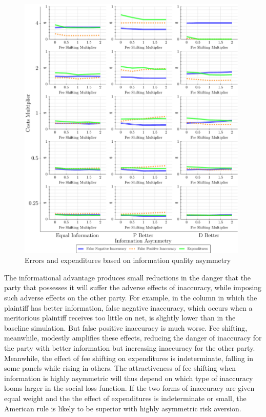 \documentclass{article}
\begin{document}
\begin{figure}
\begin{minipage}{0.48\textwidth}
        \includegraphics[width=0.98\textwidth, scale=0.70, trim={0in 0in 0in 0in}, clip]{../Figures/Accuracy and Expenditures Varying Information Asymmetry} %
        \caption{Errors and expenditures based on information quality asymmetry}
		\label{fig:accexp_playernoise_asymmetry}
    \end{minipage}
\end{figure}

The informational advantage produces small reductions in the danger that the party that possesses it will suffer the adverse effects of inaccuracy, while imposing such adverse effects on the other party. For example, in the column in which the plaintiff has better information, false negative inaccuracy, which occurs when a meritorious plaintiff receives too little on net, is slightly lower than in the baseline simulation.  But false positive inaccuracy is much worse. Fee shifting, meanwhile, modestly amplifies these effects, reducing the danger of inaccuracy for the party with better information but increasing inaccuracy for the other party. Meanwhile, the effect of fee shifting on expenditures is indeterminate, falling in some panels while rising in others. The attractiveness of fee shifting when information is highly asymmetric will thus depend on which type of inaccuracy looms larger in the social loss function. If the two forms of inaccuracy are given equal weight and the the effect of expenditures is indeterminate or small, the American rule is likely to be superior with highly asymmetric risk aversion.
\end{document}
